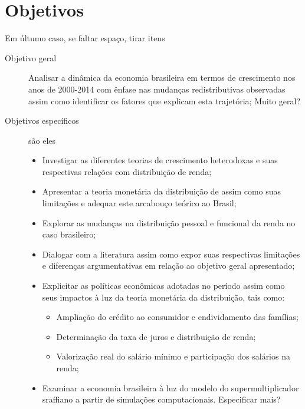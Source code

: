 \section{Objetivos}\label{OBJ}

{\color{blue} Em últumo caso, se faltar espaço, tirar itens}

\begin{description}
	\item[Objetivo geral] Analisar a dinâmica da economia brasileira em termos de crescimento nos anos de 2000-2014 com ênfase nas mudanças redistributivas observadas assim como identificar os fatores que explicam esta trajetória; {\color{blue} Muito geral?}
	\item[Objetivos específicos] {\color{white}são eles}
	\begin{itemize}
		\item Investigar as diferentes teorias de crescimento heterodoxas e suas respectivas relações com distribuição de renda;
		\item Apresentar a teoria monetária da distribuição de \textcite{pivetti_essay_1992} assim como suas limitações e adequar este arcabouço teórico ao Brasil;
		\item Explorar as mudanças na distribuição pessoal e funcional da renda no caso brasileiro;
		\item Dialogar com a literatura assim como expor suas respectivas limitações e  diferenças argumentativas em relação ao objetivo geral apresentado;
		\item Explicitar as políticas econômicas adotadas no período assim como seus impactos à luz da teoria monetária da distribuição, tais como:
		\begin{itemize}
			\item Ampliação do crédito ao consumidor e endividamento das famílias;
			\item Determinação da taxa de juros e distribuição de renda;
			\item Valorização real do salário mínimo e participação dos salários na renda;
		\end{itemize}
		\item Examinar a economia brasileira à luz do modelo do supermultiplicador sraffiano a partir de simulações computacionais. {\color{blue} Especificar mais?}
	\end{itemize}
\end{description}



